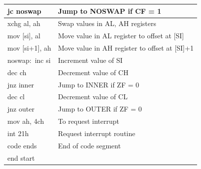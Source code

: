\documentclass[10pt,a4paper]{article}
\begin{document}
\begin{flushleft}
\begin{table}[htb]
{\begin{tabular}{|l|l|}
\hline
jc noswap                                                        & Jump to NOSWAP if CF = 1                      \\
\hline
xchg al, ah                                                      & Swap values in AL, AH registers               \\
\hline
mov [si], al                                                     & Move value in AL register to offset at [SI]   \\
\hline
mov [si+1], ah                                                   & Move value in AH register to offset at [SI]+1 \\
\hline
noswap:~inc si                                                   & Increment value of SI                         \\
\hline
dec ch                                                           & Decrement value of CH                         \\
\hline
jnz inner                                                        & Jump to INNER if ZF = 0                       \\
\hline
dec cl                                                           & Decrement value of CL                         \\
\hline
jnz outer                                                        & Jump to OUTER if ZF = 0                       \\
\hline
mov ah, 4ch                                                & To request interrupt                          \\
\hline
int 21h                                                          & Request interrupt routine                     \\ 
\hline
code ends                                                        & End of code segment                           \\
\hline
end start                                                        &                                               \\
\hline
\end{tabular}
}
\end{table}

\newpage

\end{flushleft}
\end{document}
